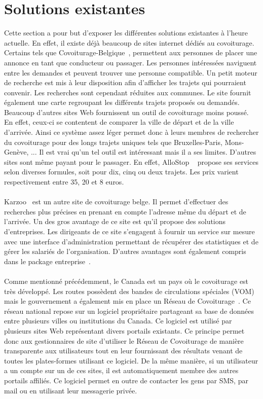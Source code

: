 \documentclass[12pt, a4paper, oneside]{article}
\begin{document}
\section{Solutions existantes}\label{sol-ex}
    Cette section a pour but d'exposer les différentes solutions existantes à l'heure actuelle. En effet, il existe déjà beaucoup de sites internet dédiés au covoiturage. Certains tels que Covoiturage-Belgique~\cite{covoiturage-belgique}, permettent aux personnes de placer une annonce en tant que conducteur ou passager. Les personnes intéressées naviguent entre les demandes et peuvent trouver une personne compatible. Un petit moteur de recherche est mis à leur disposition afin d'afficher les trajets qui pourraient convenir. Les recherches sont cependant réduites aux communes. Le site fournit également une carte regroupant les différents trajets proposés ou demandés. Beaucoup d'autres sites Web fournissent un outil de covoiturage moins poussé. En effet, ceux-ci se contentent de comparer la ville de départ et de la ville d'arrivée. Ainsi ce système assez léger permet donc à leurs membres de rechercher du covoiturage pour des longs trajets uniques tels que Bruxelles-Paris, Mons-Genève, ... Il est vrai qu'un tel outil est intéressant mais il a ses limites. D'autres sites sont même payant pour le passager. En effet, AlloStop ~\cite{allostop} propose ses services selon diverses formules, soit pour dix, cinq ou deux trajets. Les prix varient respectivement entre 35, 20 et 8 euros.\\\\
    \indent Karzoo~\cite{karzoo.be} est un autre site de covoiturage belge. Il permet d'effectuer des recherches plus précises en prenant en compte l'adresse même du départ et de l'arrivée. Un des gros avantage de ce site est qu'il propose des solutions d'entreprises. Les dirigeants de ce site s'engagent à fournir un service sur mesure avec une interface d'administration permettant de récupérer des statistiques et de gérer les salariés de l'organisation. D'autres avantages sont également compris dans le package entreprise~\cite{karzoo.be-entreprise}.\\\\
    \indent Comme mentionné précédemment, le Canada est un pays où le covoiturage est très développé. Les routes possèdent des bandes de circulations spéciales (VOM) mais le gouvernement a également mis en place un Réseau de Covoiturage~\cite{covoiturage.ca}. Ce réseau national repose sur un logiciel propriétaire partageant sa base de données entre plusieurs villes ou institutions du Canada. Ce logiciel est utilisé par plusieurs sites Web représentant divers portails existants. Ce principe permet donc aux gestionnaires de site d'utiliser le Réseau de Covoiturage de manière transparente aux utilisateurs tout en leur fournissant des résultats venant de toutes les plates-formes utilisant ce logiciel. De la même manière, si un utilisateur a un compte sur un de ces sites, il est automatiquement membre des autres portails affiliés. Ce logiciel permet en outre de contacter les gens par SMS, par mail ou en utilisant leur messagerie privée.\\\\
\end{document}
